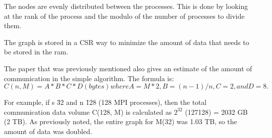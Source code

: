 The nodes are evenly distributed between the processes. This is done by looking at the rank of the process and the modulo of the number of processes to divide them.

The graph is stored in a CSR way to minimize the amount of data that needs to be stored in the ram.

The paper that was previously mentioned also gives an estimate of the amount of communication in the simple algorithm. The formula is:\\
\begin{math}
C(n, M) = A * B * C * D (bytes)  where A = M*2, B = (n-1)/n, C=2, and D=8.  
\end{math}

For example, if s \= 32 and n \= 128 (128 MPI processes), then the total communication 
data volume C(128, M) is calculated as $2^{32}$   \* (127\/128)   = 2032 GB (2 TB). As previously noted, the entire graph for M(32) was 
1.03 TB, so the amount of data was doubled.